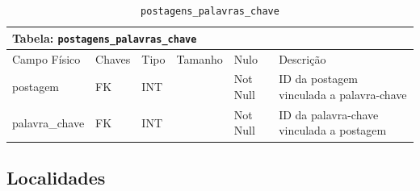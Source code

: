 \documentclass[12pt,a4paper]{article}
\begin{document}
\begin{center}
\begin{table}[h!]
	\caption{\texttt{postagens\_palavras\_chave}}
	\label{tabela:postagensPalavrasChave}
	\begin{tabular}{|p{2.3cm}|p{1.2cm}|p{1.8cm}|p{1.5cm}|p{1cm}|p{6cm}|}\hline	
		\multicolumn{6}{|p{16cm}|}{\cellcolor{cinzaClaro}  \centering Tabela: \texttt{postagens\_palavras\_chave}} \\ \hline %
		{\small Campo Físico}   & {\small Chaves} & {\small Tipo} & {\small Tamanho} & {\small Nulo} & {\small Descrição}\\\hline %
		
		{\tiny postagem} & {\tiny FK} & {\tiny INT} & {\tiny } & {\tiny Not Null} &{\tiny ID da postagem vinculada a palavra-chave}\\\hline
		{\tiny palavra\_chave} & {\tiny FK} & {\tiny INT} & {\tiny } & {\tiny Not Null} &{\tiny ID da palavra-chave vinculada a postagem}\\\hline
			
	\end{tabular}
\end{table}	
\end{center}







\newpage
\subsection{Localidades}

\end{document}
